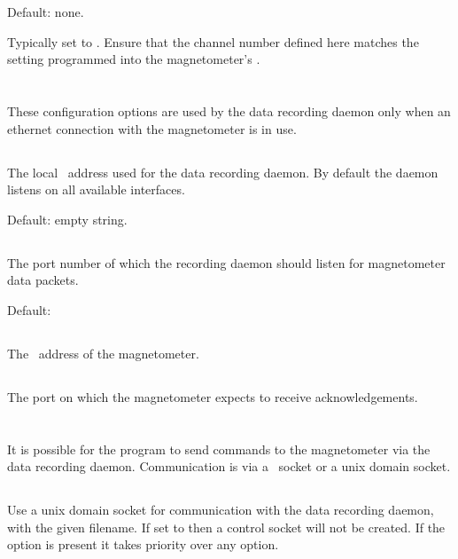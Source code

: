Default: none.

Typically set to . Ensure that the
channel number defined here matches the setting programmed into the
magnetometer's \eeprom.

\section{\code{[ethernet]}}

These configuration options are used by the data recording daemon only
when an ethernet connection with the magnetometer is in use.

\subsection{}
The local \ip\ address used for the data recording daemon. By default
the daemon listens on all available interfaces.

Default: empty string.

\subsection{}
The port number of which the recording daemon should listen for
magnetometer data packets.

Default: 

\subsection{}
The \ip\ address of the magnetometer.

\subsection{}
The port on which the magnetometer expects to receive
acknowledgements.

\section{\code{[controlsocket]}}

It is possible for the  program to send commands
to the magnetometer via the data recording daemon. Communication is
via a \udp\ socket or a unix domain socket.

\subsection{}
Use a unix domain socket for communication with the data recording
daemon, with the given filename. If set to  then a
control socket will not be created. If the  option is
present it takes priority over any  option.

